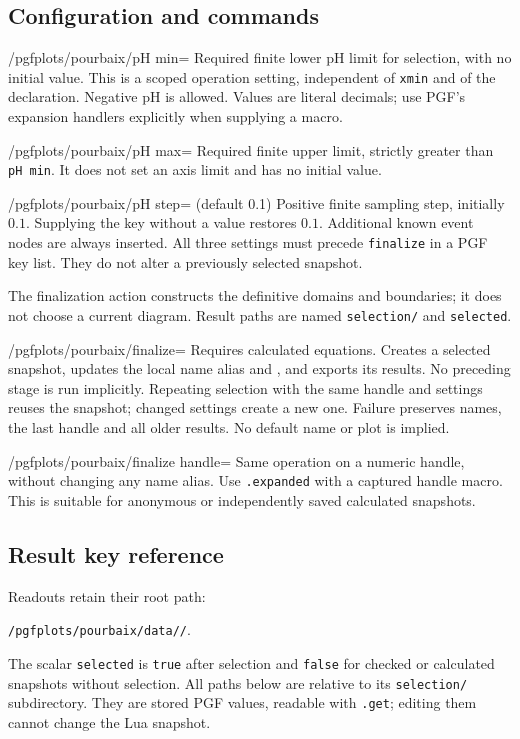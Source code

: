 \documentclass[a4paper,11pt]{ltxdoc}
\begin{document}
\subsection{Configuration and commands}
\begin{key}{/pgfplots/pourbaix/pH min=}
Required finite lower pH limit for selection, with no initial value. This is a
scoped operation setting, independent of \texttt{xmin} and of the declaration.
Negative pH is allowed. Values are literal decimals; use PGF's expansion handlers
explicitly when supplying a macro.
\end{key}
\begin{key}{/pgfplots/pourbaix/pH max=}
Required finite upper limit, strictly greater than \texttt{pH min}. It does not
set an axis limit and has no initial value.
\end{key}
\begin{key}{/pgfplots/pourbaix/pH step= (default 0.1)}
Positive finite sampling step, initially $0.1$. Supplying the key without a value
restores $0.1$. Additional known event nodes are always inserted. All three
settings must precede \texttt{finalize} in a PGF key list. They do not alter a
previously selected snapshot.
\end{key}
The finalization action constructs the definitive domains and boundaries; it does
not choose a current diagram. Result paths are named \texttt{selection/} and
\texttt{selected}.

\begin{key}{/pgfplots/pourbaix/finalize=}
Requires calculated equations. Creates a selected snapshot, updates the local
name alias and , and exports its results. No preceding
stage is run implicitly. Repeating selection with the same handle and settings
reuses the snapshot; changed settings create a new one. Failure preserves names,
the last handle and all older results. No default name or plot is implied.
\end{key}
\begin{key}{/pgfplots/pourbaix/finalize handle=}
Same operation on a numeric handle, without changing any name alias. Use
\texttt{.expanded} with a captured handle macro. This is suitable for anonymous
or independently saved calculated snapshots.
\end{key}

\subsection{Result key reference}
Readouts retain their root path:\par\smallskip
\noindent\texttt{/pgfplots/pourbaix/data/}\texttt{/}.\par\smallskip
The scalar \texttt{selected} is \texttt{true} after selection and \texttt{false}
for checked or calculated snapshots without selection. All paths below are
relative to its \texttt{selection/} subdirectory. They are stored PGF values,
readable with \texttt{.get}; editing them cannot change the Lua snapshot.
\end{document}
